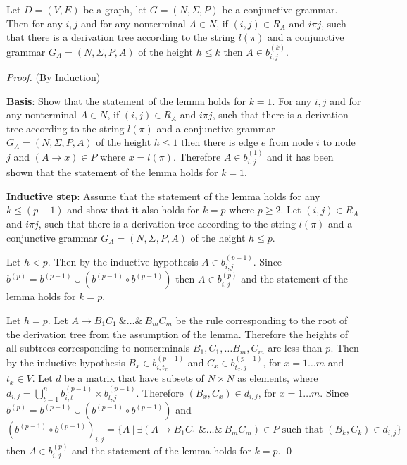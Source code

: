 \begin{lemma}\label{lemma:conj}
    Let $D = (V,E)$ be a graph, let $G =(N,\Sigma,P)$ be a conjunctive grammar. Then for any $i, j$ and for any nonterminal $A \in N$, if $(i,j) \in R_A$ and $i \pi j$, such that there is a derivation tree according to the string $l(\pi)$ and a conjunctive grammar $G_A = (N,\Sigma,P,A)$ of the height $h \leq k$ then $A \in b^{(k)}_{i,j}$.
\end{lemma}
\begin{proof}(By Induction)
    
    \textbf{Basis}: Show that the statement of the lemma holds for $k = 1$. For any $i, j$ and for any nonterminal $A \in N$, if $(i,j) \in R_A$ and $i \pi j$, such that there is a derivation tree according to the string $l(\pi)$ and a conjunctive grammar $G_A = (N,\Sigma,P,A)$ of the height $h \leq 1$ then there is edge $e$ from node $i$ to node $j$ and $(A \rightarrow x) \in P$ where $x = l(\pi)$. Therefore $A \in b^{(1)}_{i,j}$ and it has been shown that the statement of the lemma holds for $k = 1$.
    
    \textbf{Inductive step}: Assume that the statement of the lemma holds for any $k \leq (p - 1)$ and show that it also holds for $k = p$ where $p \geq 2$. Let $(i,j) \in R_A$ and $i \pi j$, such that there is a derivation tree according to the string $l(\pi)$ and a conjunctive grammar $G_A = (N,\Sigma,P,A)$ of the height $h \leq p$.
    
    Let $h < p$. Then by the inductive hypothesis $A \in b^{(p-1)}_{i,j}$. Since $b^{(p)} = b^{(p-1)} \cup (b^{(p-1)} \circ b^{(p-1)})$ then $A \in b^{(p)}_{i,j}$ and the statement of the lemma holds for $k = p$.
    
    Let $h = p$. Let $A \rightarrow B_1 C_1~\& \ldots \&~B_m C_m$ be the rule corresponding to the root of the derivation tree from the assumption of the lemma. Therefore the heights of all subtrees corresponding to nonterminals $B_1, C_1, \ldots B_m, C_m$ are less than $p$. Then by the inductive hypothesis $B_x \in b^{(p-1)}_{i,t_x}$ and $C_x \in b^{(p-1)}_{t_x,j}$, for $x = 1\ldots m$ and $t_x \in V$. Let $d$ be a matrix that have subsets of $N \times N$ as elements, where $d_{i,j} = \bigcup^{n}_{t=1}{b^{(p-1)}_{i,t} \times b^{(p-1)}_{t,j}}$. Therefore $(B_x, C_x) \in d_{i,j}$, for $x = 1\ldots m$. Since $b^{(p)} = b^{(p-1)} \cup (b^{(p-1)} \circ b^{(p-1)})$ and $(b^{(p-1)} \circ b^{(p-1)})_{i,j} = \{A~|~\exists (A \rightarrow B_1 C_1~\& \ldots \&~B_m C_m) \in P \text{ such that } (B_k, C_k) \in d_{i,j} \}$ then $A \in b^{(p)}_{i,j}$ and the statement of the lemma holds for $k = p$. \qed
\end{proof}

